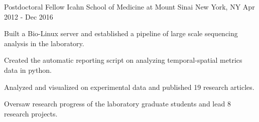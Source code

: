 \begin{cventries}
	\cventry
	{Postdoctoral Fellow} %
	{Icahn School of Medicine at Mount Sinai} %
	{New York, NY} %
	{Apr 2012 - Dec 2016} %
	{
		\begin{cvitems} %
			\item {Built a Bio-Linux server and established a pipeline of large scale sequencing analysis in the laboratory.}
			\item {Created the automatic reporting script on analyzing temporal-spatial metrics data in python.}
			\item {Analyzed and visualized on experimental data and published 19 research articles.}
			\item {Oversaw research progress of the laboratory graduate students and lead 8 research projects.}
		\end{cvitems}
	}



\end{cventries}
